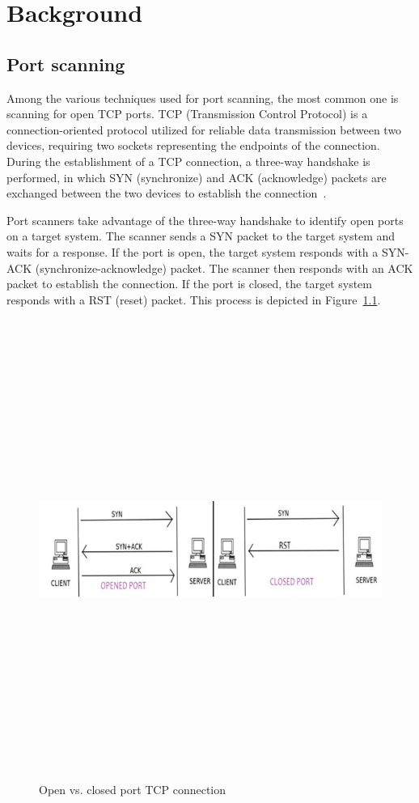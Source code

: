 \chapter{Background}

\section{Port scanning}

Among the various techniques used for port scanning, the most common one is scanning for open TCP ports. TCP (Transmission Control Protocol) is a connection-oriented protocol utilized for reliable data transmission between two devices, requiring two sockets representing the endpoints of the connection. During the establishment of a TCP connection, a three-way handshake is performed, in which SYN (synchronize) and ACK (acknowledge) packets are exchanged between the two devices to establish the connection~\cite{de1999}.

Port scanners take advantage of the three-way handshake to identify open ports on a target system. The scanner sends a SYN packet to the target system and waits for a response. If the port is open, the target system responds with a SYN-ACK (synchronize-acknowledge) packet. The scanner then responds with an ACK packet to establish the connection. If the port is closed, the target system responds with a RST (reset) packet. This process is depicted in Figure~\ref{fig:open-vs-closed}.

\begin{figure}[h]
    \centering
    \includegraphics[width=15cm, height=15cm, keepaspectratio]{background/img/open_vs_closed_port.png}
    \caption{Open vs. closed port TCP connection~\cite{Elijla2013}}
    \label{fig:open-vs-closed}
\end{figure}

